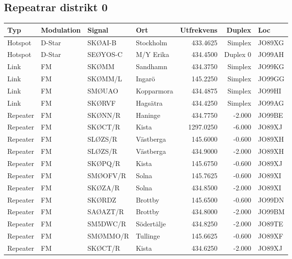 \subsection{Repeatrar distrikt 0}
\begin{longtable}{llllrrl}
	Typ      & Modulation & Signal   & Ort             & Utfrekvens &   Duplex & Loc    \\ \hline
	Hotspot  & D-Star     & SKØAI-B  & Stockholm       &   433.4625 &  Simplex & JO89XG \\
	Hotspot  & D-Star     & SEØYOS-C & M/Y Erika       &   434.4500 & Duplex 0 & JO99AH \\
	Link     & FM         & SKØMM    & Sandhamn        &   434.3750 &  Simplex & JO99KG \\
	Link     & FM         & SKØMM/L  & Ingarö          &   145.2250 &  Simplex & JO99GG \\
	Link     & FM         & SMØUAO   & Kopparmora      &   434.4875 &  Simplex & JO99HI \\
	Link     & FM         & SKØRVF   & Hagsätra        &   434.4250 &  Simplex & JO99AG \\
	Repeater & FM         & SKØNN/R  & Haninge         &   434.7750 &   -2.000 & JO99BE \\
	Repeater & FM         & SKØCT/R  & Kista           &  1297.0250 &   -6.000 & JO89XJ \\
	Repeater & FM         & SLØZS/R  & Västberga       &   145.6000 &   -0.600 & JO89XH \\
	Repeater & FM         & SLØZS/R  & Västberga       &   434.9000 &   -2.000 & JO89XH \\
	Repeater & FM         & SKØPQ/R  & Kista           &   145.6750 &   -0.600 & JO89XJ \\
	Repeater & FM         & SMØOFV/R & Solna           &   145.7625 &   -0.600 & JO89XI \\
	Repeater & FM         & SKØZA/R  & Solna           &   434.8500 &   -2.000 & JO89XI \\
	Repeater & FM         & SKØRDZ   & Brottby         &   145.6500 &   -0.600 & JO99DN \\
	Repeater & FM         & SAØAZT/R & Brottby         &   434.8000 &   -2.000 & JO99BM \\
	Repeater & FM         & SM5DWC/R & Södertälje      &   434.8250 &   -2.000 & JO89TE \\
	Repeater & FM         & SMØMMO/R & Tullinge        &   145.6625 &   -0.600 & JO89XF \\
	Repeater & FM         & SKØCT/R  & Kista           &   434.6250 &   -2.000 & JO89XJ \\

\end{longtable}
